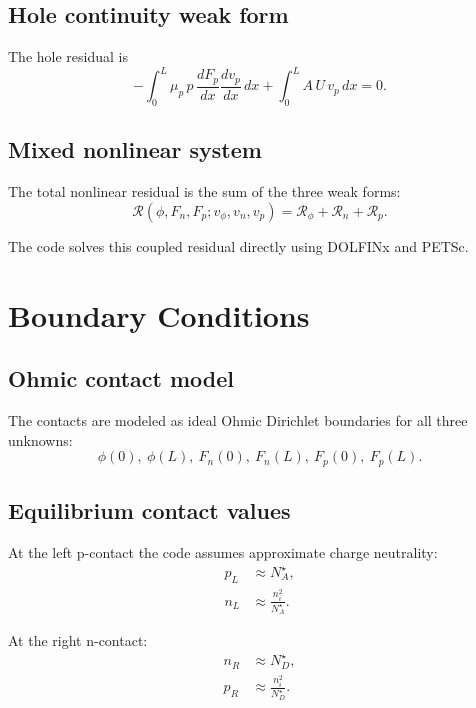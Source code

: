 \documentclass[11pt]{article}
\begin{document}
\subsection{Hole continuity weak form}

The hole residual is
\begin{equation}
    -\int_0^L
    \mu_p\,p\,\frac{dF_p}{dx}\frac{dv_p}{dx}\,dx
    +
    \int_0^L
    A\,U\,v_p\,dx
    = 0.
\end{equation}

\subsection{Mixed nonlinear system}

The total nonlinear residual is the sum of the three weak forms:
\[
    \mathcal{R}(\phi,F_n,F_p;v_\phi,v_n,v_p)
    =
    \mathcal{R}_\phi + \mathcal{R}_n + \mathcal{R}_p.
\]

The code solves this coupled residual directly using DOLFINx and PETSc.

\section{Boundary Conditions}

\subsection{Ohmic contact model}

The contacts are modeled as ideal Ohmic Dirichlet boundaries for all three
unknowns:
\[
    \phi(0),\ \phi(L),\ F_n(0),\ F_n(L),\ F_p(0),\ F_p(L).
\]

\subsection{Equilibrium contact values}

At the left p-contact the code assumes approximate charge neutrality:
\begin{align}
    p_L &\approx N_A^\star, \\
    n_L &\approx \frac{n_i^2}{N_A^\star}.
\end{align}

At the right n-contact:
\begin{align}
    n_R &\approx N_D^\star, \\
    p_R &\approx \frac{n_i^2}{N_D^\star}.
\end{align}
\end{document}

